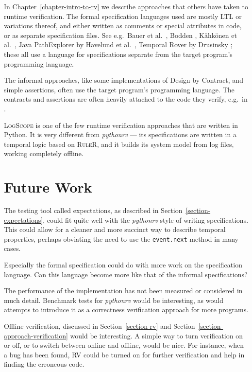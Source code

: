 In Chapter~\ref{chapter-intro-to-rv} we describe approaches that others have
taken to runtime verification. The formal specification languages used are
mostly LTL or variations thereof, and either written as comments or special
attributes in code, or as separate specification files. See e.g.\ Bauer et
al.\ \cite{bauer06monitoring}, Bodden \cite{bodden05efficientrv}, Kähkönen et
al.\ \cite{kahkonen09lime}, Java PathExplorer by Havelund et al.\
\cite{havelund04jpax}, Temporal Rover by Drusinsky
\cite{drusinsky00temporalrover}; these all use a language for specifications
separate from the target program's programming language.

The informal approaches, like some implementations of Design by Contract, and
simple assertions, often use the target program's programming language. The
contracts and assertions are often heavily attached to the code they verify,
e.g.\ in \cite{bartetzko01jass,meyer92applyingdbc}.

\textsc{LogScope} \cite{barringer09tutorial} is one of the few runtime
verification approaches that are written in Python. It is very different from
\textit{pythonrv} --- its specifications are written in a temporal logic based
on \textsc{RuleR}, and it builds its system model from log files, working
completely offline.

\section{Future Work}

The testing tool called expectations, as described in
Section~\ref{section-expectations}, could fit quite well with the
\textit{pythonrv} style of writing specifications. This could allow for a
cleaner and more succinct way to describe temporal properties, perhaps
obviating the need to use the \texttt{event.next} method in many cases.

Especially the formal specification could do with more work on the
specification language. Can this language become more like that of the informal
specifications?

The performance of the implementation has not been measured or considered in
much detail. Benchmark tests for \textit{pythonrv} would be interesting, as
would attempts to introduce it as a correctness verification approach for more
programs.

Offline verification, discussed in Section~\ref{section-rv} and
Section~\ref{section-approach-verification} would be interesting. A simple way
to turn verification on or off, or to switch between online and offline, would
be nice. For instance, when a bug has been found, RV could be turned on for
further verification and help in finding the erroneous code.

